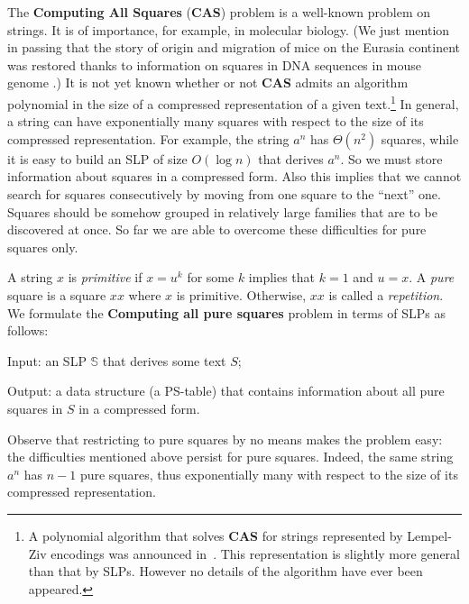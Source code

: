 \documentclass[11pt]{article}
\begin{document}
The {\bf Computing All Squares} ({\bf CAS}) problem is a
well-known problem on strings. It is of importance, for example,
in molecular biology. (We just mention in passing that the story
of origin and migration of mice on the Eurasia continent was
restored thanks to information on squares in DNA sequences in
mouse genome \cite{19}.) It is not yet known whether or not {\bf
CAS} admits an algorithm polynomial in the size of a compressed
representation of a given text.\footnote{A polynomial algorithm
that solves {\bf CAS} for strings represented by Lempel-Ziv
encodings was announced in~\cite{8}. This representation is
slightly more general than that by SLPs. However no details of the
algorithm have ever been appeared.} In general, a string can have
exponentially many squares with respect to the size of its
compressed representation. For example, the string $a^n$ has
$\Theta(n^2)$ squares, while it is easy to build an SLP of size
$O(\log n)$ that derives $a^n$. So we must store information about
squares in a compressed form. Also this implies that we cannot
search for squares consecutively by moving from one square to the
``next'' one. Squares should be somehow grouped in relatively
large families that are to be discovered at once. So far we are
able to overcome these difficulties for pure squares only.

A string $x$ is \emph{primitive} if $x = u^k$ for some $k$ implies
that $k = 1$ and $u = x$. A \emph{pure} square is a square $xx$
where $x$ is primitive. Otherwise, $xx$ is called a
\emph{repetition}. We formulate the {\bf Computing all pure
squares} problem in terms of SLPs as follows:

{\sc Input:} an SLP $\mathbb{S}$ that derives some text $S$;

{\sc Output:} a data structure (a PS-table) that contains information
about all pure squares in $S$ in a compressed form.

Observe that restricting to pure squares by no means makes the problem
easy: the difficulties mentioned above persist for pure squares. Indeed,
the same string $a^n$ has $n-1$ pure squares, thus exponentially many
with respect to the size of its compressed representation.
\end{document}
